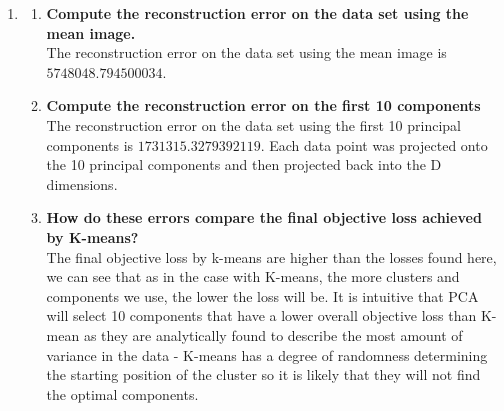 \documentclass[submit]{harvardml}
\begin{document}
\begin{enumerate}
    \item 
    \begin{enumerate}
        \item \textbf{Compute the reconstruction error on the data set using the mean image.}\\
        The reconstruction error on the data set using the mean image is $5748048.794500034$.
        \item \textbf{Compute the reconstruction error on the first 10 components}\\
        The reconstruction error on the data set using the first 10 principal components is $1731315.3279392119$. Each data point was projected onto the 10 principal components and then projected back into the D dimensions.
        \item \textbf{How do these errors compare the final objective loss achieved by K-means?}\\
        The final objective loss by k-means are higher than the losses found here, we can see that as in the case with K-means, the more clusters and components we use, the lower the loss will be. It is intuitive that PCA will select 10 components that have a lower overall objective loss than K-mean as they are analytically found to describe the most amount of variance in the data - K-means has a degree of randomness determining the starting position of the cluster so it is likely that they will not find the optimal components. 
    \end{enumerate}
    
\end{enumerate}

\newpage
\end{document}
